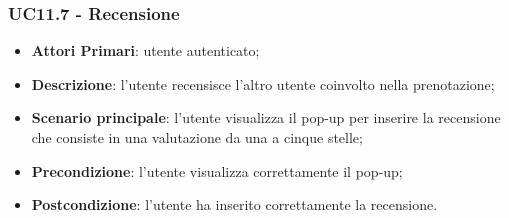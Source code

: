 \subsubsection{UC11.7 - Recensione}
\begin{itemize}
	\item \textbf{Attori Primari}: utente autenticato;
	\item \textbf{Descrizione}: l'utente recensisce l'altro utente coinvolto nella prenotazione;
	\item \textbf{Scenario principale}: l'utente visualizza il pop-up per inserire la recensione che consiste in una valutazione da una a cinque stelle;
	\item \textbf{Precondizione}: l'utente visualizza correttamente il pop-up;
	\item \textbf{Postcondizione}: l'utente ha inserito correttamente la recensione.
\end{itemize}

